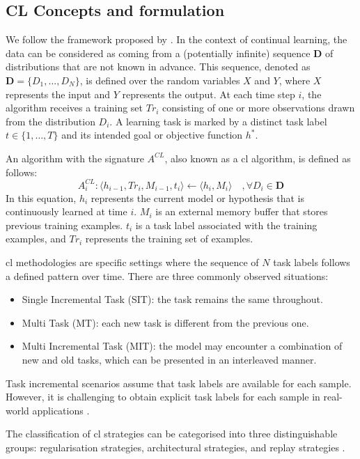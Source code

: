 \subsection{CL Concepts and formulation}
We follow the framework proposed by \citep{lesort2020continual}. 
In the context of continual learning, the data can be considered as coming from a (potentially infinite) sequence $\mathbf{D}$ of distributions that are not known in advance. This sequence, denoted as $\mathbf{D} = \{ D_{1}, ..., D_{N} \}$, is defined over the random variables $X$ and $Y$, where $X$ represents the input and $Y$ represents the output. At each time step $i$, the algorithm receives a training set $Tr_{i}$ consisting of one or more observations drawn from the distribution $D_{i}$. A learning task is marked by a distinct task label $t\in \{ 1,\dots,T\}$ and its intended goal or objective function $h^{*}$.

An algorithm with the signature $A^{CL}$, also known as a \acrlong{cl} algorithm, is defined as follows: \begin{equation} \label{eq:CL_algo} A_{i}^{CL} : \langle h_{i-1}, Tr_{i}, M_{i-1}, t_{i} \rangle \leftarrow \langle h_{i}, M_{i} \rangle \quad , \forall D_{i} \in \mathbf{D} \end{equation} In this equation, $h_i$ represents the current model or hypothesis that is continuously learned at time $i$. $M_{i}$ is an external memory buffer that stores previous training examples. $t_{i}$ is a task label associated with the training examples, and $Tr_{i}$ represents the training set of examples.

\acrshort{cl} methodologies are specific settings where the sequence of $N$ task labels follows a defined pattern over time. There are three commonly observed situations: \begin{itemize} \item Single Incremental Task (SIT): the task remains the same throughout. \item Multi Task (MT): each new task is different from the previous one. \item Multi Incremental Task (MIT): the model may encounter a combination of new and old tasks, which can be presented in an interleaved manner. \end{itemize} Task incremental scenarios assume that task labels are available for each sample. However, it is challenging to obtain explicit task labels for each sample in real-world applications \citep{cossu2021continual}.

The classification of \acrshort{cl} strategies can be categorised into three distinguishable groups: regularisation strategies, architectural strategies, and replay strategies \citep{parisi2019continual}. 


